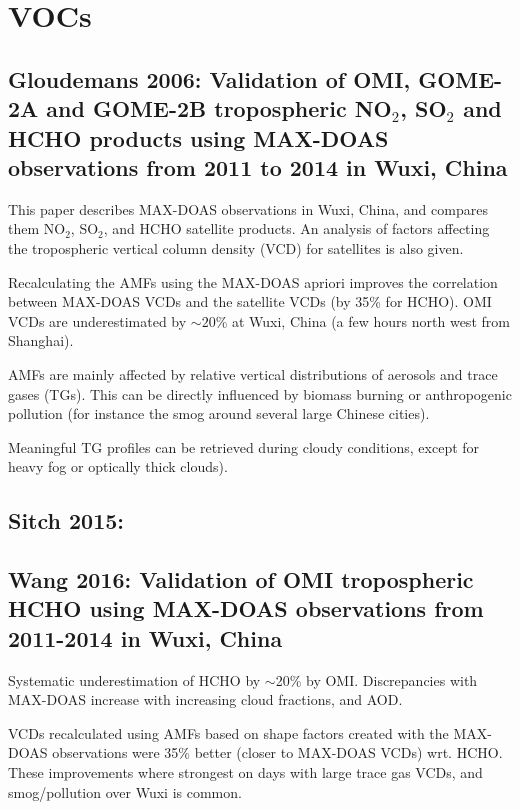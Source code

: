 \documentclass[11pt]{article} %
\begin{document}
      
\section{VOCs}
    
  \subsection{Gloudemans 2006: Validation of OMI, GOME-2A and GOME-2B tropospheric NO$_2$, SO$_2$ and HCHO products using MAX-DOAS observations from 2011 to 2014 in Wuxi, China}
    \citet{Gloudemans2006}
    
    This paper describes MAX-DOAS observations in Wuxi, China, and compares them NO$_2$, SO$_2$, and HCHO satellite products.
    An analysis of factors affecting the tropospheric vertical column density (VCD) for satellites is also given.
    
    Recalculating the AMFs using the MAX-DOAS apriori improves the correlation between MAX-DOAS VCDs and the satellite VCDs (by 35\% for HCHO). 
    OMI VCDs are underestimated by $\sim20$\% at Wuxi, China (a few hours north west from Shanghai).
    
    AMFs are mainly affected by relative vertical distributions of aerosols and trace gases (TGs).
    This can be directly influenced by biomass burning or anthropogenic pollution (for instance the smog around several large Chinese cities).
    
    Meaningful TG profiles can be retrieved during cloudy conditions, except for heavy fog or optically thick clouds).
    
  \subsection{Sitch 2015: }
  
  \subsection{Wang 2016: Validation of OMI tropospheric HCHO using MAX-DOAS observations from 2011-2014 in Wuxi, China}
    \citet{Wang2016}
    Systematic underestimation of HCHO by $\sim$20\% by OMI.
    Discrepancies with MAX-DOAS increase with increasing cloud fractions, and AOD.
    
    VCDs recalculated using AMFs based on shape factors created with the MAX-DOAS observations were 35\% better (closer to MAX-DOAS VCDs) wrt. HCHO.
    These improvements where strongest on days with large trace gas VCDs, and smog/pollution over Wuxi is common.
    
\end{document}
